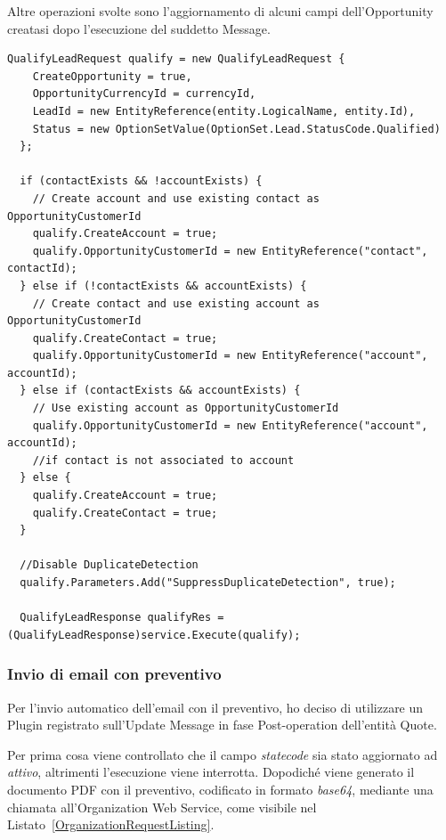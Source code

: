 Altre operazioni svolte sono l'aggiornamento di alcuni campi dell'Opportunity creatasi dopo l'esecuzione del suddetto Message.

\begin{lstlisting}[language={[Sharp]C},breaklines=true,caption={Utilizzo del Message QualifyLeadRequest.},label=QualifyLeadRequestListing]
  QualifyLeadRequest qualify = new QualifyLeadRequest {
    CreateOpportunity = true,
    OpportunityCurrencyId = currencyId,
    LeadId = new EntityReference(entity.LogicalName, entity.Id),
    Status = new OptionSetValue(OptionSet.Lead.StatusCode.Qualified)
  };

  if (contactExists && !accountExists) {
    // Create account and use existing contact as OpportunityCustomerId
    qualify.CreateAccount = true;
    qualify.OpportunityCustomerId = new EntityReference("contact", contactId);
  } else if (!contactExists && accountExists) {
    // Create contact and use existing account as OpportunityCustomerId
    qualify.CreateContact = true;
    qualify.OpportunityCustomerId = new EntityReference("account", accountId);
  } else if (contactExists && accountExists) {
    // Use existing account as OpportunityCustomerId
    qualify.OpportunityCustomerId = new EntityReference("account", accountId);
    //if contact is not associated to account 
  } else {
    qualify.CreateAccount = true;
    qualify.CreateContact = true;
  }

  //Disable DuplicateDetection
  qualify.Parameters.Add("SuppressDuplicateDetection", true);

  QualifyLeadResponse qualifyRes = (QualifyLeadResponse)service.Execute(qualify);
\end{lstlisting}

\subsubsection{Invio di email con preventivo}
\label{ssec:invioEmail}
Per l'invio automatico dell'email con il preventivo, ho deciso di utilizzare un Plugin registrato sull'Update Message in fase Post-operation dell'entità Quote. 

Per prima cosa viene controllato che il campo \textit{statecode} sia stato aggiornato ad \textit{attivo}, altrimenti l'esecuzione viene interrotta.
Dopodiché viene generato il documento PDF con il preventivo, codificato in formato \textit{base64}, mediante una chiamata all'Organization Web Service, come visibile nel Listato~\ref{OrganizationRequestListing}.

